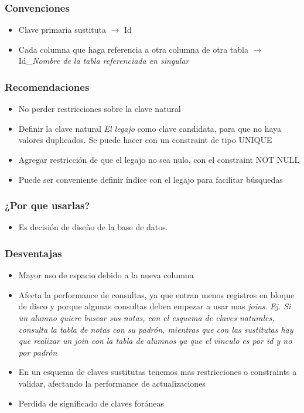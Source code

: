 \subsubsection*{Convenciones}
\begin{itemize}
\item Clave primaria sustituta $\rightarrow$ Id
\end{itemize}
\begin{itemize}
\item Cada columna que haga referencia a otra columna de otra tabla $\rightarrow$ Id\_\textit{Nombre de la tabla referenciada en singular}
\end{itemize}

\subsubsection*{Recomendaciones}
\begin{itemize}
\item No perder restricciones sobre la clave natural
\item Definir la clave natural \textit{El legajo} como clave candidata, para que no haya valores duplicados. Se puede hacer con un constraint de tipo UNIQUE
\item Agregar restricción de que el legajo no sea nulo, con el constraint NOT NULL
\item Puede ser conveniente definir índice con el legajo para facilitar búsquedas
\end{itemize}

\subsubsection*{¿Por que usarlas?}
\begin{itemize}
\item Es decisión de diseño de la base de datos.
\end{itemize}

\subsubsection*{Desventajas}

\begin{itemize}
\item Mayor uso de espacio debido a la nueva columna
\item Afecta la performance de consultas, ya que entran menos registros en bloque de disco y porque algunas consultas deben empezar a usar mas \textit{joins}. \textit{Ej. Si un alumno quiere buscar sus notas, con el esquema de claves naturales, consulta la tabla de notas con su padrón, mientras que con las sustitutas hay que realizar un join con la tabla de alumnos ya que el vinculo es por id y no por padrón }
\item En un esquema de claves sustitutas tenemos mas restricciones o constraints a validar, afectando la performance de actualizaciones
\item Perdida de significado de claves foráneas
\end{itemize}

